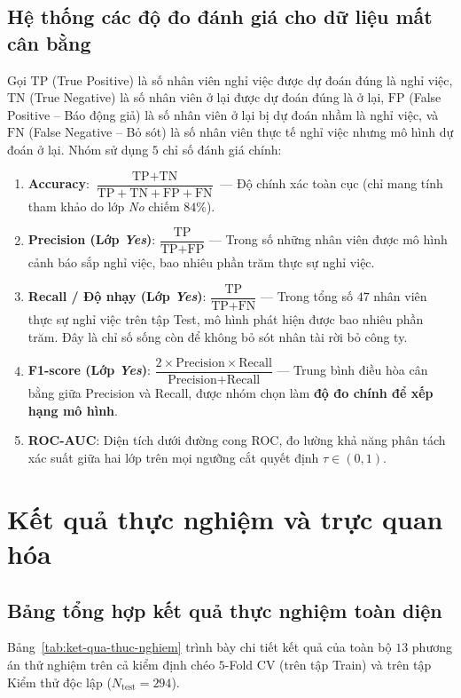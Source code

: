 \subsection{Hệ thống các độ đo đánh giá cho dữ liệu mất cân bằng}
Gọi $\text{TP}$ (True Positive) là số nhân viên nghỉ việc được dự đoán đúng là nghỉ việc, $\text{TN}$ (True Negative) là số nhân viên ở lại được dự đoán đúng là ở lại, $\text{FP}$ (False Positive -- Báo động giả) là số nhân viên ở lại bị dự đoán nhầm là nghỉ việc, và $\text{FN}$ (False Negative -- Bỏ sót) là số nhân viên thực tế nghỉ việc nhưng mô hình dự đoán ở lại. Nhóm sử dụng $5$ chỉ số đánh giá chính:
\begin{enumerate}
    \item \textbf{Accuracy}: $\dfrac{\text{TP} + \text{TN}}{\text{TP} + \text{TN} + \text{FP} + \text{FN}}$ --- Độ chính xác toàn cục (chỉ mang tính tham khảo do lớp \textit{No} chiếm $84\%$).
    \item \textbf{Precision (Lớp \textit{Yes})}: $\dfrac{\text{TP}}{\text{TP} + \text{FP}}$ --- Trong số những nhân viên được mô hình cảnh báo sắp nghỉ việc, bao nhiêu phần trăm thực sự nghỉ việc.
    \item \textbf{Recall / Độ nhạy (Lớp \textit{Yes})}: $\dfrac{\text{TP}}{\text{TP} + \text{FN}}$ --- Trong tổng số $47$ nhân viên thực sự nghỉ việc trên tập Test, mô hình phát hiện được bao nhiêu phần trăm. Đây là chỉ số sống còn để không bỏ sót nhân tài rời bỏ công ty.
    \item \textbf{F1-score (Lớp \textit{Yes})}: $\dfrac{2 \times \text{Precision} \times \text{Recall}}{\text{Precision} + \text{Recall}}$ --- Trung bình điều hòa cân bằng giữa Precision và Recall, được nhóm chọn làm \textbf{độ đo chính để xếp hạng mô hình}.
    \item \textbf{ROC-AUC}: Diện tích dưới đường cong ROC, đo lường khả năng phân tách xác suất giữa hai lớp trên mọi ngưỡng cắt quyết định $\tau \in (0, 1)$.
\end{enumerate}

\section{Kết quả thực nghiệm và trực quan hóa}

\subsection{Bảng tổng hợp kết quả thực nghiệm toàn diện}
Bảng~\ref{tab:ket-qua-thuc-nghiem} trình bày chi tiết kết quả của toàn bộ $13$ phương án thử nghiệm trên cả kiểm định chéo $5$-Fold CV (trên tập Train) và trên tập Kiểm thử độc lập ($N_{\text{test}} = 294$).

